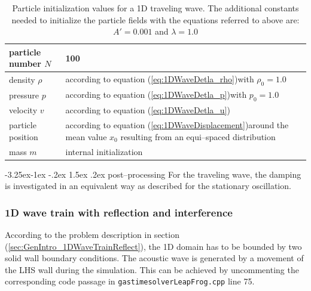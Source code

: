 \documentclass{report}
\makeatletter
\renewcommand\paragraph{\@startsection{paragraph}{4}{\z@}%
  {-3.25ex\@plus -1ex \@minus -.2ex}%
  {1.5ex \@plus .2ex}%
  {\normalfont\normalsize\bfseries}}
\makeatother
\begin{document}
\begin{table}[h] %
\label{tab:InitPartValues_1DTravelingWave}
\centering

\begin{tabular}[c]{|l|p{5cm}|} %
\hline
\hline
particle number $N$ &  100\\
\hline
density $\rho$ &  according to equation (\ref{eq:1DWaveDetla_rho})\newline with $\rho_0=1.0$\\
\hline
pressure $p$ &  according to equation (\ref{eq:1DWaveDetla_p})\newline with $p_0=1.0$\\
\hline
velocity $v$ & according to equation (\ref{eq:1DWaveDetla_u})\\
\hline
particle position & according to equation (\ref{eq:1DWaveDisplacement})\newline around the mean value $x_0$\newline
resulting from an equi--spaced distribution \\
\hline
mass $m$ & internal initialization\\
\hline
\hline
\end{tabular}
\caption[]{Particle initialization values for a 1D traveling wave. The additional constants needed to initialize the particle fields with the equations referred to above are: $A'=0.001$ and $\lambda=1.0$}

\end{table}

\paragraph{post--processing}
For the traveling wave, the damping is investigated in an equivalent way as described for the stationary oscillation.

\subsubsection{1D wave train with reflection and interference}
According to the problem description in section (\ref{sec:GenIntro_1DWaveTrainReflect}), the 1D domain has to be bounded by two solid wall boundary conditions. The acoustic wave is generated by a movement of the LHS wall during the simulation. This can be achieved by uncommenting the corresponding code passage in {\tt gastimesolverLeapFrog.cpp} line 75. 
\end{document}
